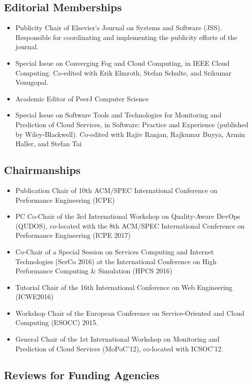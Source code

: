 \documentclass[paper=letter,fontsize=11pt]{scrartcl} %
\begin{document}
\subsection*{Editorial Memberships}
\begin{itemize}
\item Publicity Chair of Elsevier's Journal on Systems and Software (JSS). Responsible for coordinating and implementing the publicity efforts of the journal.
\item Special Issue on Converging Fog and Cloud Computing, in IEEE Cloud Computing. Co-edited with Erik Elmroth, Stefan Schulte, and Srikumar Venugopal.
\item Academic Editor of PeerJ Computer Science
\item Special Issue on Software Tools and Technologies for Monitoring and Prediction of Cloud Services, in Software: Practice and Experience (published by Wiley-Blackwell). Co-edited with Rajiv Ranjan, Raj\-kumar Buyya, Armin Haller, and Stefan Tai
\end{itemize}

\subsection*{Chairmanships}
\begin{itemize}
\item Publication Chair of 10th ACM/SPEC International Conference on Performance Engineering (ICPE)
\item PC Co-Chair of the  3rd International Workshop on Quality-Aware DevOps (QUDOS), co-located with the  8th ACM/SPEC International Conference on Performance Engineering (ICPE 2017)
\item Co-Chair of a Special Session on Services Computing and Internet Technologies (SerCo 2016) at the International Conference on High Performance Computing \& Simulation (HPCS 2016)
\item Tutorial Chair of the 16th International Conference on Web Engineering (ICWE2016)
\item Workshop Chair of the European Conference on Service-Oriented
and Cloud Computing (ESOCC) 2015.
\item General Chair of the 1st International Workshop on Monitoring and
Prediction of Cloud Services (MoPoC'12), co-located with ICSOC'12.
\end{itemize}


\subsection*{Reviews for Funding Agencies}
\end{document}
